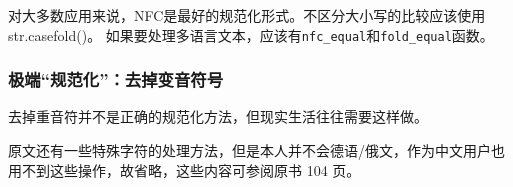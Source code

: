 对大多数应用来说，NFC是最好的规范化形式。不区分大小写的比较应该使用str.casefold()。
如果要处理多语言文本，应该有\texttt{nfc\_equal}和\texttt{fold\_equal}函数。



\subsubsection{极端``规范化''：去掉变音符号}

去掉重音符并不是正确的规范化方法，但现实生活往往需要这样做。



原文还有一些特殊字符的处理方法，但是本人并不会德语/俄文，作为中文用户也用不到这些操作，故省略，这些内容可参阅原书 104 页。


\newpage